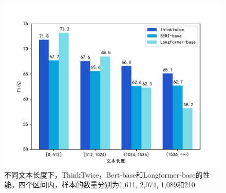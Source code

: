 \begin{figure}[htbp]
    \centering
    \includegraphics[scale=0.8]{figure/3-3.pdf}
    \caption{不同文本长度下，ThinkTwice，Bert-base和Longformer-base的性能。四个区间内，样本的数量分别为1,611, 2,074, 1,089和210}
    \label{fig:3-3}
\end{figure}
